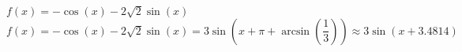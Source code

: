 {$f(x) = -\cos(x) - 2\sqrt{2} \sin(x)$}
{ $f(x) = -\cos(x) - 2\sqrt{2} \sin(x) = 3\sin\left(x+\pi + \arcsin\left(\dfrac{1}{3}\right)\right) \approx 3\sin(x+3.4814)$}
